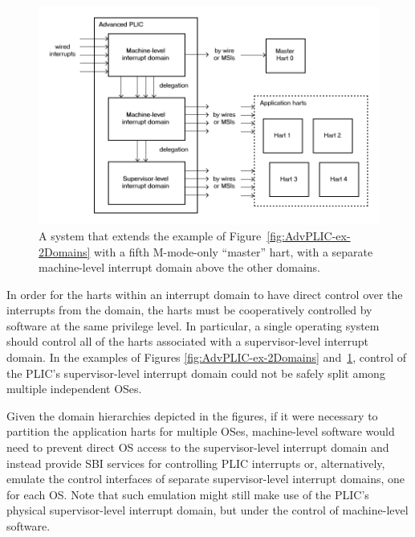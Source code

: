 \begin{figure}[th]
\centerline{\includegraphics[scale=0.55]{AdvPLIC-ex-3Domains.png}}
\caption{%
A {\RISCV} system that extends the example of
Figure~\ref{fig:AdvPLIC-ex-2Domains} with a fifth \mbox{M-mode}-only
``master'' hart, with a separate machine-level interrupt domain above
the other domains.%
}
\label{fig:AdvPLIC-ex-3Domains}
\end{figure}

\FloatBarrier

\begin{commentary}
In order for the harts within an interrupt domain to have direct
control over the interrupts from the domain, the harts must be
cooperatively controlled by software at the same privilege level.
In particular, a single operating system should control all of the
harts associated with a supervisor-level interrupt domain.
In the examples of Figures \ref{fig:AdvPLIC-ex-2Domains}
and~\ref{fig:AdvPLIC-ex-3Domains}, control of the PLIC's
supervisor-level interrupt domain could not be safely split among
multiple independent OSes.

Given the domain hierarchies depicted in the figures, if it were
necessary to partition the application harts for multiple OSes,
machine-level software would need to prevent direct OS access to the
supervisor-level interrupt domain and instead provide SBI services
for controlling PLIC interrupts or, alternatively, emulate the control
interfaces of separate supervisor-level interrupt domains, one for each
OS.
Note that such emulation might still make use of the PLIC's
physical supervisor-level interrupt domain, but under the control of
machine-level software.
\end{commentary}

